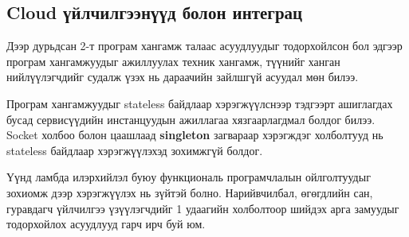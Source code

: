 \subsection{Cloud үйлчилгээнүүд болон интеграц}
Дээр дурьдсан 2-т програм хангамж талаас асуудлуудыг тодорхойлсон бол эдгээр програм хангамжуудыг ажиллуулах техник хангамж, түүнийг ханган нийлүүлэгчдийг судалж үзэх нь дараачийн зайлшгүй асуудал мөн билээ. 

Програм хангамжуудыг stateless байдлаар хэрэгжүүлснээр тэдгээрт ашиглагдах бусад сервисүүдийн инстанцуудын ажиллагаа хязгаарлагдмал болдог билээ. Socket холбоо болон цаашлаад \textbf{singleton} загвараар хэрэгждэг холболтууд нь stateless байдлаар хэрэгжүүлэхэд зохимжгүй болдог. 

Үүнд ламбда илэрхийлэл буюу функциональ програмчлалын ойлголтуудыг зохиомж дээр хэрэгжүүлэх нь зүйтэй болно\cite{awsLambda}. Нарийвчилбал, өгөгдлийн сан, гуравдагч үйлчилгээ үзүүлэгчдийг 1 удаагийн холболтоор шийдэх арга замуудыг тодорхойлох асуудлууд гарч ирч буй юм.

\clearpage